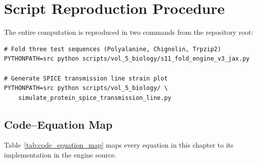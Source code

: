 \section{Script Reproduction Procedure}

The entire computation is reproduced in two commands from the repository root:

\begin{verbatim}
# Fold three test sequences (Polyalanine, Chignolin, Trpzip2)
PYTHONPATH=src python scripts/vol_5_biology/s11_fold_engine_v3_jax.py

# Generate SPICE transmission line strain plot
PYTHONPATH=src python scripts/vol_5_biology/ \
    simulate_protein_spice_transmission_line.py
\end{verbatim}

\subsection{Code--Equation Map}

Table~\ref{tab:code_equation_map} maps every equation in this chapter to its implementation in the engine source.

